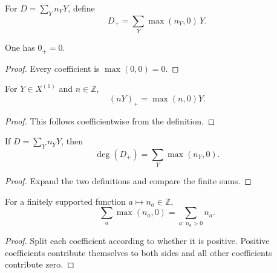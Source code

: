 \begin{definition}
  \label{def:WeilDivisor_positivePart}
  \leanok

  For \(D=\sum_Y n_YY\), define
  \[
    D_+=\sum_Y\max(n_Y,0)\,Y.
  \]
\end{definition}

\begin{lemma}
  \label{lem:positivePart_zero}
  \leanok
  One has \(0_+=0\).
\end{lemma}
\begin{proof}
  \leanok
  Every coefficient is \(\max(0,0)=0\).
\end{proof}

\begin{lemma}
  \label{lem:positivePart_single}
  \leanok
  For \(Y\in X^{(1)}\) and \(n\in\mathbb Z\),
  \[
    (nY)_+=\max(n,0)Y.
  \]
\end{lemma}
\begin{proof}
  \leanok
  This follows coefficientwise from the definition.
\end{proof}

\begin{lemma}
  \label{lem:degree_positivePart_eq_sum_max}
  \leanok
  If \(D=\sum_Yn_YY\), then
  \[
    \deg(D_+)=\sum_Y\max(n_Y,0).
  \]
\end{lemma}
\begin{proof}
  \leanok
  Expand the two definitions and compare the finite sums.
\end{proof}

\begin{lemma}
  \label{lem:finsupp_sum_max_zero_eq_sum_filter_pos}
  \leanok
  For a finitely supported function \(a\mapsto n_a\in\mathbb Z\),
  \[
    \sum_a\max(n_a,0)=\sum_{a:\,n_a>0}n_a.
  \]
\end{lemma}
\begin{proof}
  \leanok
  Split each coefficient according to whether it is positive.  Positive
  coefficients contribute themselves to both sides and all other
  coefficients contribute zero.
\end{proof}

